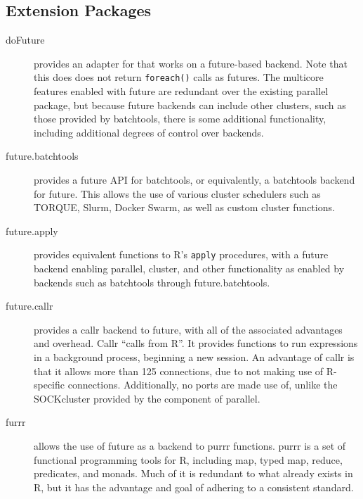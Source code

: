 \hypertarget{sec:extension-packages}{%
    \subsection{Extension Packages}\label{sec:extension-packages}}

\begin{description}
    \item[doFuture]
        \cite{bengtsson20do} provides an adapter for \cite{microsoft20}
        that works on a future-based backend. Note that this does does not
        return \texttt{foreach()} calls as futures. The multicore features enabled with
        future are redundant over the existing parallel package, but because
        future backends can include other clusters, such as those provided by
        batchtools, there is some additional functionality, including additional
        degrees of control over backends.
    \item[future.batchtools]
        \cite{bengtsson19batch} provides a future API for
        batchtools\cite{lang17}, or equivalently, a batchtools backend for
        future. This allows the use of various cluster schedulers such as
        TORQUE, Slurm, Docker Swarm, as well as custom cluster functions.
    \item[future.apply]
        \cite{bengtsson20apply} provides equivalent functions to R's
        \texttt{apply} procedures, with a future backend enabling parallel,
        cluster, and other functionality as enabled by backends such as
        batchtools through future.batchtools.
    \item[future.callr]
        \cite{bengtsson19callr} provides a callr\cite{csardi20} backend to
        future, with all of the associated advantages and overhead. Callr
        ``calls \R from R''. It provides functions to run expressions in a
        background \R process, beginning a new session. An advantage of callr is
        that it allows more than 125 connections, due to not making use of
        R-specific connections. Additionally, no ports are made use of, unlike
        the SOCKcluster provided by the  component of parallel.
    \item[furrr]
        \cite{vaughan18} allows the use of future as a backend to purrr
        functions. purrr is a set of functional programming tools for R,
        including map, typed map, reduce, predicates, and monads. Much of it is
        redundant to what already exists in R, but it has the advantage and goal
        of adhering to a consistent standard.
\end{description}

